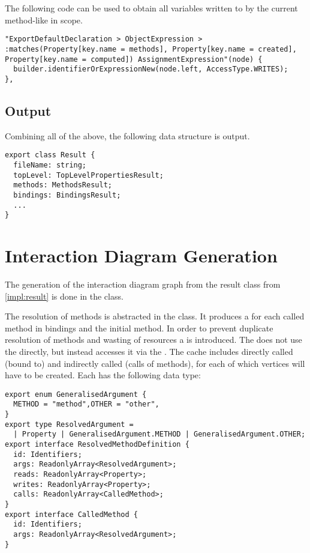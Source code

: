 The following code can be used to obtain all variables written to by the current method-like in scope. 
\begin{lstlisting}
"ExportDefaultDeclaration > ObjectExpression > 
:matches(Property[key.name = methods], Property[key.name = created],
Property[key.name = computed]) AssignmentExpression"(node) {
  builder.identifierOrExpressionNew(node.left, AccessType.WRITES);
},
\end{lstlisting}
\subsection{Output}
Combining all of the above, the following data structure is output.
\begin{lstlisting}
export class Result {
  fileName: string;
  topLevel: TopLevelPropertiesResult;
  methods: MethodsResult;
  bindings: BindingsResult;
  ...
}
\end{lstlisting}
\label{impl:result}
\section{Interaction Diagram Generation}
The generation of the interaction diagram graph from the result class from \ref{impl:result} is done in the  class. 

The resolution of methods is abstracted in the  class. It produces a 
 for each called method in bindings and the initial method. In order to prevent duplicate resolution of methods and wasting of resources a  is introduced. The  does not use the  directly, but instead accesses it via the . The cache includes directly called (bound to) and indirectly called (calls of methods), for each of which vertices will have to be created. 
Each  has the following data type:
\begin{lstlisting}
export enum GeneralisedArgument {
  METHOD = "method",OTHER = "other",
}
export type ResolvedArgument =
  | Property | GeneralisedArgument.METHOD | GeneralisedArgument.OTHER;
export interface ResolvedMethodDefinition {
  id: Identifiers;
  args: ReadonlyArray<ResolvedArgument>;
  reads: ReadonlyArray<Property>;
  writes: ReadonlyArray<Property>;
  calls: ReadonlyArray<CalledMethod>;
}
export interface CalledMethod {
  id: Identifiers;
  args: ReadonlyArray<ResolvedArgument>;
}
\end{lstlisting}


